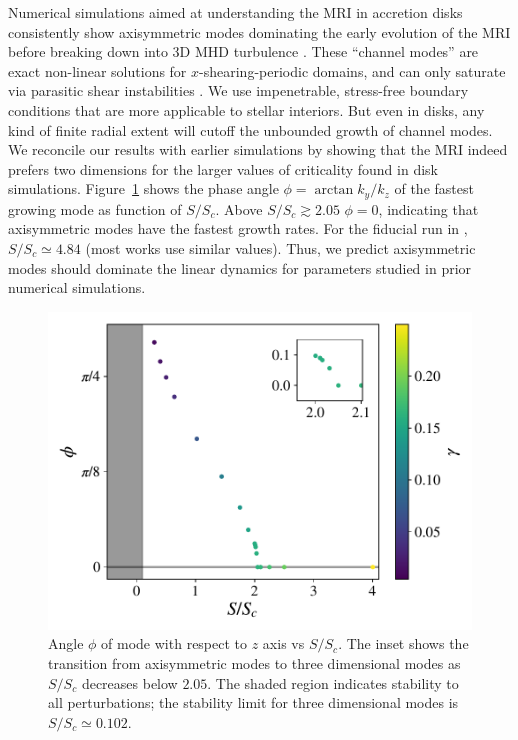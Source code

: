 \documentclass[aps,prl,reprint,superscriptaddress]{revtex4-1}
\newcommand{\SSC}{S/S_{c}}
\begin{document}
Numerical simulations aimed at understanding the MRI in accretion disks consistently show axisymmetric modes dominating the early evolution of the MRI before breaking down into 3D MHD turbulence \citep{1995ApJ...440..742H,2018ApJ...853..174H,2019ApJS..241...26D}. 
These ``channel modes'' are exact non-linear solutions for $x$-shearing-periodic domains, and can only saturate via parasitic shear instabilities \citep{1994ApJ...432..213G}.
We use impenetrable, stress-free boundary conditions that are more applicable to stellar interiors. 
But even in disks, any kind of finite radial extent will cutoff the unbounded growth of channel modes. 
We reconcile our results with earlier simulations by showing that the MRI indeed prefers two dimensions for the larger values of criticality found in disk simulations. 
Figure~\ref{fig:phi} shows the phase angle $\phi = \arctan k_y/k_z$ of the fastest growing mode as function of $\SSC$.
Above $\SSC \gtrsim 2.05$ $\phi=0$, indicating that axisymmetric modes have the fastest growth rates.
For the fiducial run in \citet{1996ApJ...464..690H}, $\SSC \simeq 4.84$ (most works use similar values).
Thus, we predict axisymmetric modes should dominate the linear dynamics for parameters studied in prior numerical simulations.
\begin{figure}[h!]
  \includegraphics[width=\columnwidth]{phi_vs_ssc_grid.pdf}
  \caption{Angle $\phi$ of mode with respect to $z$ axis vs $\SSC$. The inset shows the transition from axisymmetric modes to three dimensional modes as $\SSC$ decreases below $2.05$. The shaded region indicates stability to all perturbations; the stability limit for three dimensional modes is $\SSC \simeq 0.102$.}
  \label{fig:phi}
\end{figure}
\end{document}
